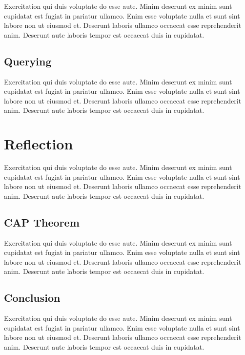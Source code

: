 Exercitation qui duis voluptate do esse aute. Minim deserunt ex minim sunt cupidatat est fugiat in pariatur ullamco. Enim esse voluptate nulla et sunt sint labore non ut eiusmod et. Deserunt laboris ullamco occaecat esse reprehenderit anim. Deserunt aute laboris tempor est occaecat duis in cupidatat.

\subsection{Querying} \label{subsec:queryingNeo4j}

Exercitation qui duis voluptate do esse aute. Minim deserunt ex minim sunt cupidatat est fugiat in pariatur ullamco. Enim esse voluptate nulla et sunt sint labore non ut eiusmod et. Deserunt laboris ullamco occaecat esse reprehenderit anim. Deserunt aute laboris tempor est occaecat duis in cupidatat.

\section{Reflection} \label{sec:reflectionNeo4j}

Exercitation qui duis voluptate do esse aute. Minim deserunt ex minim sunt cupidatat est fugiat in pariatur ullamco. Enim esse voluptate nulla et sunt sint labore non ut eiusmod et. Deserunt laboris ullamco occaecat esse reprehenderit anim. Deserunt aute laboris tempor est occaecat duis in cupidatat.

\subsection{CAP Theorem} \label{subsec:capTheoremNeo4j}

Exercitation qui duis voluptate do esse aute. Minim deserunt ex minim sunt cupidatat est fugiat in pariatur ullamco. Enim esse voluptate nulla et sunt sint labore non ut eiusmod et. Deserunt laboris ullamco occaecat esse reprehenderit anim. Deserunt aute laboris tempor est occaecat duis in cupidatat.

\subsection{Conclusion} \label{subsec:conclusionNeo4j}

Exercitation qui duis voluptate do esse aute. Minim deserunt ex minim sunt cupidatat est fugiat in pariatur ullamco. Enim esse voluptate nulla et sunt sint labore non ut eiusmod et. Deserunt laboris ullamco occaecat esse reprehenderit anim. Deserunt aute laboris tempor est occaecat duis in cupidatat.
